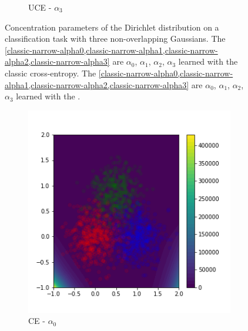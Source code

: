 \begin{figure}[H]
\begin{subfigure}{0.24\textwidth}
        \caption{UCE - $\alpha_3$}
        \label{new-narrow-alpha3}
    \end{subfigure}
    \caption{Concentration parameters of the Dirichlet distribution on a classification task with three non-overlapping Gaussians. The \cref{classic-narrow-alpha0,classic-narrow-alpha1,classic-narrow-alpha2,classic-narrow-alpha3} are $\alpha_0$, $\alpha_1$, $\alpha_2$, $\alpha_3$ learned with the classic cross-entropy. The \cref{classic-narrow-alpha0,classic-narrow-alpha1,classic-narrow-alpha2,classic-narrow-alpha3} are $\alpha_0$, $\alpha_1$, $\alpha_2$, $\alpha_3$ learned with the \UncertaintyLoss.}
    \label{fig:alpha_classification}
\end{figure}

\begin{figure}[H]
\centering
    \begin{subfigure}{0.24\textwidth}
        \centering
        \includegraphics[width=\linewidth]{sections/010_neurips2019/paper/images/classic-spread-alpha0.png}
        \caption{CE - $\alpha_0$}
        \label{classic-spread-alpha0}
    \end{subfigure}
    \hspace{-0.4cm}
    \begin{subfigure}{0.24\textwidth}
        \centering

\end{subfigure}
\end{figure}
